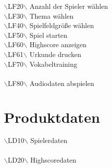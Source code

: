 \noindent$\backslash$LF20$\backslash$ \hspace{15 mm}Anzahl der Spieler wählen\\
\noindent$\backslash$LF30$\backslash$ \hspace{15 mm}Thema wählen\\
\noindent$\backslash$LF40$\backslash$ \hspace{15 mm}Spielfeldgröße wählen\\


\noindent$\backslash$LF50$\backslash$ \hspace{15 mm}Spiel starten\\

\noindent $\backslash$LF60$\backslash$ \hspace{15 mm}Highscore anzeigen\\
$\backslash$LF61$\backslash$ \hspace{15 mm}Urkunde drucken\\

\noindent$\backslash$LF70$\backslash$ \hspace{15 mm} Vokabeltraining\\ \\
\noindent$\backslash$LF80$\backslash$ \hspace{15 mm}Audiodaten abspielen \\ 


\section{Produktdaten} %
$\backslash$LD10$\backslash$ \hspace{15 mm}Spielerdaten \\ \\
\noindent $\backslash$LD20$\backslash$ \hspace{15 mm}Highscoredaten \\ \\

